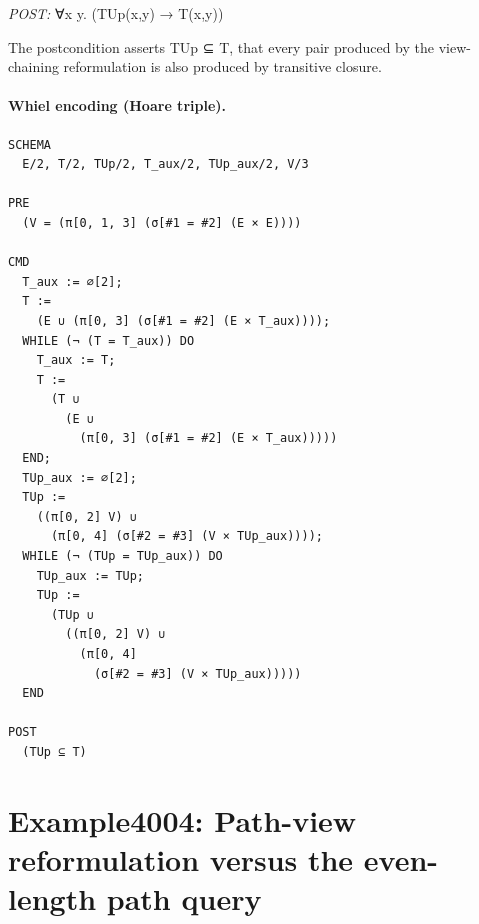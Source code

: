 \documentclass[10pt]{article}
\begin{document}
\textit{POST:} ∀x y. (TUp(x,y) → T(x,y))\par The postcondition asserts TUp ⊆ T, that every pair produced by the view-chaining reformulation is also produced by transitive closure.

\paragraph{Whiel encoding (Hoare triple).}

\begin{Verbatim}[fontsize=\scriptsize,breaklines=true,breakanywhere=true,frame=single,framesep=1.5mm]
SCHEMA
  E/2, T/2, TUp/2, T_aux/2, TUp_aux/2, V/3

PRE
  (V = (π[0, 1, 3] (σ[#1 = #2] (E × E))))

CMD
  T_aux := ∅[2];
  T :=
    (E ∪ (π[0, 3] (σ[#1 = #2] (E × T_aux))));
  WHILE (¬ (T = T_aux)) DO
    T_aux := T;
    T :=
      (T ∪
        (E ∪
          (π[0, 3] (σ[#1 = #2] (E × T_aux)))))
  END;
  TUp_aux := ∅[2];
  TUp :=
    ((π[0, 2] V) ∪
      (π[0, 4] (σ[#2 = #3] (V × TUp_aux))));
  WHILE (¬ (TUp = TUp_aux)) DO
    TUp_aux := TUp;
    TUp :=
      (TUp ∪
        ((π[0, 2] V) ∪
          (π[0, 4]
            (σ[#2 = #3] (V × TUp_aux)))))
  END

POST
  (TUp ⊆ T)
\end{Verbatim}

\Needspace{0.45\textheight}

\section{Example4004: Path-view reformulation versus the even-length path query}\label{case:Example4004}
\end{document}
